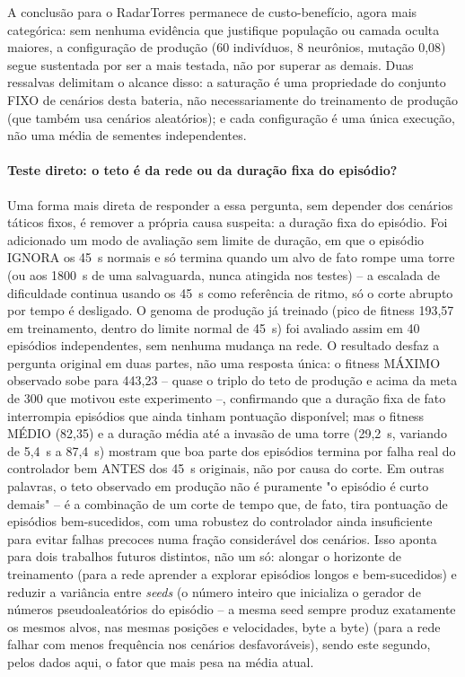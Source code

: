 \documentclass[12pt,a4paper]{article}
\begin{document}
A conclusão para o RadarTorres permanece de custo-benefício, agora mais categórica: sem nenhuma
evidência que justifique população ou camada oculta maiores, a configuração de produção (60
indivíduos, 8 neurônios, mutação 0,08) segue sustentada por ser a mais testada, não por superar as
demais. Duas ressalvas delimitam o alcance disso: a saturação é uma propriedade do conjunto FIXO de
cenários desta bateria, não necessariamente do treinamento de produção (que também usa cenários
aleatórios); e cada configuração é uma única execução, não uma média de sementes independentes.

\paragraph{Teste direto: o teto é da rede ou da duração fixa do episódio?}
Uma forma mais direta de responder a essa pergunta, sem depender dos cenários táticos fixos, é
remover a própria causa suspeita: a duração fixa do episódio. Foi adicionado um modo de avaliação
sem limite de duração, em que o episódio IGNORA os 45~s normais e só
termina quando um alvo de fato rompe uma torre (ou aos 1800~s de uma salvaguarda, nunca atingida nos
testes) -- a escalada de dificuldade continua usando os 45~s como referência de ritmo, só o corte
abrupto por tempo é desligado. O genoma de produção já treinado (pico de fitness 193,57 em
treinamento, dentro do limite normal de 45~s) foi avaliado assim em 40 episódios independentes, sem
nenhuma mudança na rede. O resultado desfaz a pergunta original em duas partes, não uma resposta
única: o fitness MÁXIMO observado sobe para 443,23 -- quase o triplo do teto de produção e acima da
meta de 300 que motivou este experimento --, confirmando que a duração fixa de fato interrompia
episódios que ainda tinham pontuação disponível; mas o fitness MÉDIO (82,35) e a duração média até a
invasão de uma torre (29,2~s, variando de 5,4~s a 87,4~s) mostram que boa parte dos episódios termina
por falha real do controlador bem ANTES dos 45~s originais, não por causa do corte. Em outras
palavras, o teto observado em produção não é puramente "o episódio é curto demais" -- é a combinação
de um corte de tempo que, de fato, tira pontuação de episódios bem-sucedidos, com uma robustez do
controlador ainda insuficiente para evitar falhas precoces numa fração considerável dos cenários.
Isso aponta para dois trabalhos futuros distintos, não um só: alongar o horizonte de treinamento
(para a rede aprender a explorar episódios longos e bem-sucedidos) e reduzir a variância entre
\textit{seeds} (o número inteiro que inicializa o gerador de números pseudoaleatórios do episódio
-- a mesma seed sempre produz exatamente os mesmos alvos, nas mesmas posições e velocidades, byte a
byte) (para a rede falhar com menos frequência nos cenários desfavoráveis), sendo este segundo,
pelos dados aqui, o fator que mais pesa na média atual.
\end{document}
